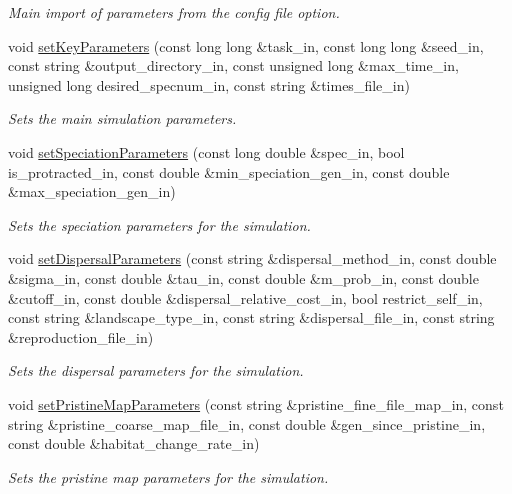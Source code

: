 \begin{DoxyCompactItemize}
\begin{DoxyCompactList}\small\item\em Main import of parameters from the config file option. \end{DoxyCompactList}\item 
void \hyperlink{struct_sim_parameters_aa6684caccd53613a5d08ff4071d0edc9}{set\+Key\+Parameters} (const long long \&task\+\_\+in, const long long \&seed\+\_\+in, const string \&output\+\_\+directory\+\_\+in, const unsigned long \&max\+\_\+time\+\_\+in, unsigned long desired\+\_\+specnum\+\_\+in, const string \&times\+\_\+file\+\_\+in)
\begin{DoxyCompactList}\small\item\em Sets the main simulation parameters. \end{DoxyCompactList}\item 
void \hyperlink{struct_sim_parameters_a6753a70e7b9183c97fb1b304b089968d}{set\+Speciation\+Parameters} (const long double \&spec\+\_\+in, bool is\+\_\+protracted\+\_\+in, const double \&min\+\_\+speciation\+\_\+gen\+\_\+in, const double \&max\+\_\+speciation\+\_\+gen\+\_\+in)
\begin{DoxyCompactList}\small\item\em Sets the speciation parameters for the simulation. \end{DoxyCompactList}\item 
void \hyperlink{struct_sim_parameters_a74782aab11b1e07a507cc60bdec3bf95}{set\+Dispersal\+Parameters} (const string \&dispersal\+\_\+method\+\_\+in, const double \&sigma\+\_\+in, const double \&tau\+\_\+in, const double \&m\+\_\+prob\+\_\+in, const double \&cutoff\+\_\+in, const double \&dispersal\+\_\+relative\+\_\+cost\+\_\+in, bool restrict\+\_\+self\+\_\+in, const string \&landscape\+\_\+type\+\_\+in, const string \&dispersal\+\_\+file\+\_\+in, const string \&reproduction\+\_\+file\+\_\+in)
\begin{DoxyCompactList}\small\item\em Sets the dispersal parameters for the simulation. \end{DoxyCompactList}\item 
void \hyperlink{struct_sim_parameters_a117bb284f7bd540e0301e7985d08614a}{set\+Pristine\+Map\+Parameters} (const string \&pristine\+\_\+fine\+\_\+file\+\_\+map\+\_\+in, const string \&pristine\+\_\+coarse\+\_\+map\+\_\+file\+\_\+in, const double \&gen\+\_\+since\+\_\+pristine\+\_\+in, const double \&habitat\+\_\+change\+\_\+rate\+\_\+in)
\begin{DoxyCompactList}\small\item\em Sets the pristine map parameters for the simulation. \end{DoxyCompactList}\item 

\end{DoxyCompactItemize}
